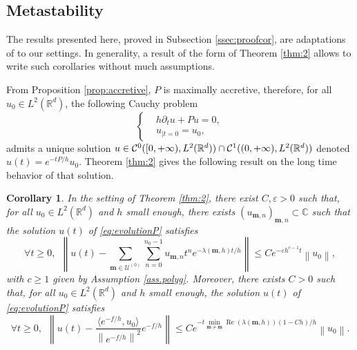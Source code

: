 \documentclass[12pt]{amsart}
\renewcommand{\Re}{\operatorname{Re}}
\newcommand{\C}{\mathbb C}
\newcommand{\R}{\mathbb R}
\def\<{\langle}
\def\>{\rangle}
\numberwithin{equation}{section}
\numberwithin{figure}{section}
\def\m{\mathbf{m}}
\def\um{\underline{\m}}
\newcommand{\vvert}[1]{\left\lVert#1\right\rVert}
\newtheorem{corollary}[defin]{Corollary}
\def\uuu{{\mathcal U}}\def\vvv{{\mathcal V}}\def\www{{\mathcal W}}\def\xxx{{\mathcal X}}
\begin{document}
\subsection{Metastability}
The results presented here, proved in Subsection \ref{ssec:proofcor}, are adaptations of \cite[Corollary 1.5, 1.6]{BoLePMi22} to our settings. In generality, a result of the form of Theorem \ref{thm:2} allows to write such corollaries without much assumptions.

From Proposition \ref{prop:accretive}, $P$ is maximally accretive, therefore, for all $u_0\in L^2(\R^d)$, the following Cauchy problem
\begin{equation}\label{eq:evolutionP}
\left\{
\begin{aligned}
    &h\partial_tu + Pu = 0,\\
    &u_{|t=0} = u_0,
\end{aligned}
\right.
\end{equation}
admits a unique solution $u\in\ccc^0([0,+\infty),L^2(\R^d))\cap\ccc^1((0,+\infty),L^2(\R^d))$ denoted $u(t) = e^{-tP/h}u_0$. Theorem \ref{thm:2} gives the following result on the long time behavior of that solution.

\begin{corollary}\label{cor:return}
    In the setting of Theorem \ref{thm:2}, there exist $C,\varepsilon>0$ such that, for all $u_0\in L^2(\R^d)$ and $h$ small enough, there exists $(u_{\m,n})_{\m,n}\subset\C$ such that the solution $u(t)$ of \eqref{eq:evolutionP} satisfies
    \begin{equation}\label{eq:return1}
    \forall t\geq0,\ \ \vvert{u(t) - \sum_{\m\in\uuu^{(0)}}\sum_{n=0}^{n_0-1}u_{\m,n}t^ne^{-\lambda(\m,h)t/h}} \leq Ce^{-\varepsilon h^{c-1}t}\vvert{u_0},
    \end{equation}
    with $c\geq1$ given by Assumption \ref{ass.polyg}. Moreover, there exists $C>0$ such that, for all $u_0\in L^2(\R^d)$ and $h$ small enough, the solution $u(t)$ of \eqref{eq:evolutionP} satisfies
    \begin{equation}\label{eq:return2}
    \forall t\geq 0,\ \ \vvert{u(t) - \frac{\<e^{-f/h},u_0\>}{\vvert{e^{-f/h}}^2}e^{-f/h}} \leq Ce^{-t\underset{\m\neq\um}{\min}\Re(\lambda(\m,h))(1-Ch)/h}\vvert{u_0}.
    \end{equation}
\end{corollary}
\end{document}
